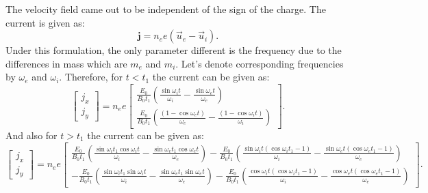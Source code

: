 \documentclass[11pt]{amsart}
\begin{document}
The velocity field came out to be independent of the sign of the charge. The current is given as:
\begin{equation}
\label{eq:18}
\mathbf{j}=n_{e} e (\vec{u}_e-\vec{u}_i).
\end{equation}
Under this formulation, the only parameter different is the frequency due to the differences in mass which are $m_e$ and $m_i$. Let's denote corresponding frequencies by $\omega_e$ and $\omega_i$. Therefore, for $t<t_1$ the current can be given as:
\begin{equation}
\label{eq:19}
\begin{bmatrix}
j_x\\ 
j_y
\end{bmatrix}
=
n_{e}e
\begin{bmatrix}
\frac{E_0 }{B_0 t_1 }(\frac{\sin{\omega_i t}}{\omega_i}-\frac{\sin{\omega_e t}}{\omega_e})\\ 
\frac{E_0 }{B_0 t_1 }(\frac{(1-\cos{\omega_e t})}{\omega_e}-\frac{(1-\cos{\omega_i t})}{\omega_i})
\end{bmatrix}.
\end{equation}
And also for $t>t_1$ the current can be given as:
\begin{equation}
\label{eq:20}
\begin{bmatrix}
j_x\\ 
j_y
\end{bmatrix}
=
n_{e}e
\begin{bmatrix}
\frac{E_0 }{B_0 t_1 }(\frac{\sin{\omega_i t_1} \cos{\omega_i t}}{\omega_i}-\frac{\sin{\omega_e t_1}\cos{\omega_e t}}{\omega_e})-\frac{E_0 }{B_0 t_1 }(\frac{\sin{\omega_i t} (\cos{\omega_i t_1}-1)}{\omega_i}-\frac{\sin{\omega_e t}(\cos{\omega_e t_1}-1)}{\omega_e})\\ 
-\frac{E_0 }{B_0 t_1 }(\frac{\sin{\omega_i t_1} \sin{\omega_i t}}{\omega_i}-\frac{\sin{\omega_e t_1}\sin{\omega_e t}}{\omega_e})-\frac{E_0 }{B_0 t_1 }(\frac{\cos{\omega_i t} (\cos{\omega_i t_1}-1)}{\omega_i}-\frac{\cos{\omega_e t}(\cos{\omega_e t_1}-1)}{\omega_e})
\end{bmatrix}.
\end{equation}
\end{document}
